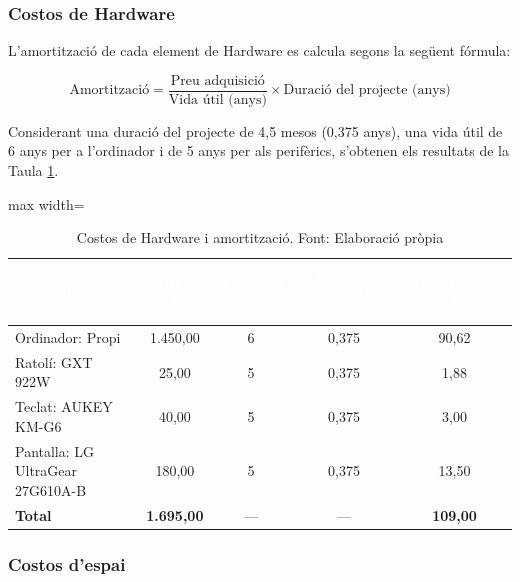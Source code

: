 \documentclass[11pt,a4paper]{report}
\begin{document}
\subsubsection{Costos de Hardware}

L'amortització de cada element de Hardware es calcula segons la següent fórmula:

\begin{equation}
    \text{Amortització} = \frac{\text{Preu adquisició}}{\text{Vida útil (anys)}} 
    \times \text{Duració del projecte (anys)}
    \label{eq:amortitzacio}
\end{equation}

Considerant una duració del projecte de 4,5 mesos (0,375 anys), una vida útil de 
6 anys per a l'ordinador i de 5 anys per als perifèrics, s'obtenen els resultats de la Taula \ref{tab:hardware}.

\begin{table}[H]
    \centering
    \small
    \renewcommand{\arraystretch}{2}
    \begin{adjustbox}{max width=\textwidth}
    \begin{tabular}{|l|c|c|c|c|}
        \hline
        \rowcolor{oceanblue}
        \textcolor{white}{\textbf{Element}} &
        \textcolor{white}{\textbf{Preu (€)}} &
        \textcolor{white}{\textbf{Vida útil (anys)}} &
        \textcolor{white}{\textbf{Duració projecte (anys)}} &
        \textcolor{white}{\textbf{Amortització (€)}} \\
        \hline
        Ordinador: Propi                    & 1.450,00 & 6 & 0,375 &  90,62 \\
        \hline
        Ratolí: GXT 922W                    &    25,00 & 5 & 0,375 &   1,88 \\
        \hline
        Teclat: AUKEY KM-G6                 &    40,00 & 5 & 0,375 &   3,00 \\
        \hline
        Pantalla: LG UltraGear 27G610A-B    &   180,00 & 5 & 0,375 &  13,50 \\
        \hline
        \rowcolor{gray!20}
        \textbf{Total} & \textbf{1.695,00} & --- & --- & \textbf{109,00} \\
        \hline
    \end{tabular}
    \end{adjustbox}
    \caption[Costos de Hardware]{Costos de Hardware i amortització. Font: Elaboració pròpia}
    \label{tab:hardware}
\end{table}

\subsubsection{Costos d'espai}
\end{document}
